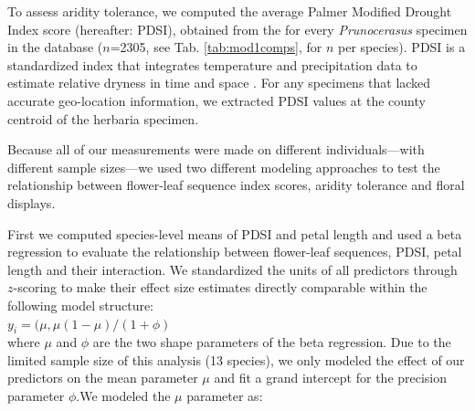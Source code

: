 \documentclass{article}[12pt]
\begin{document}
To assess aridity tolerance, we computed the average Palmer Modified Drought Index score (hereafter: PDSI), obtained from the \citet{NOAA} for every \textit{Prunocerasus} specimen in the database ($n$=2305, see Tab. \ref{tab:mod1comps}, for $n$ per species). PDSI is a standardized index that integrates temperature and precipitation data to estimate relative dryness in time and space \citep{Heim:2002uw}. For any specimens that lacked accurate geo-location information, we extracted PDSI values at the county centroid of the herbaria specimen. 

Because all of our measurements were made on different individuals---with different sample sizes---we used two different modeling approaches to test the relationship between flower-leaf sequence index scores, aridity tolerance and floral displays.

First we computed species-level means of PDSI and petal length and used a beta regression to evaluate the relationship between flower-leaf sequences, PDSI, petal length and their interaction. We standardized the units of all predictors through $z$-scoring \citep{Gelman2007} to make their effect size estimates directly comparable within the following model structure:\\

$y_i = (\mu,\mu(1-\mu)/(1+\phi)$\\

where $\mu$ and $\phi$ are the two shape parameters of the beta regression. Due to the limited sample size of this analysis (13 species), we only modeled the effect of our predictors on the mean parameter $\mu$ and fit a grand intercept for the precision parameter $\phi$.We modeled the $\mu$ parameter as: \\
\end{document}
